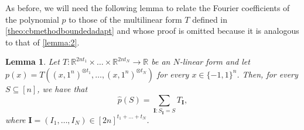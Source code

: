 \documentclass[11pt]{article}
\newcommand{\R}{\mathbb{R}} %
\newcommand{\1}{\mathbf{1}}
\newcommand{\ind}[1]{\mathbf{#1}}
\theoremstyle{plain}
\newtheorem{lemma}[theorem]{Lemma}
\theoremstyle{definition}
\theoremstyle{remark}
\begin{document}
As before, we will need the following lemma to relate the Fourier coefficients of the polynomial $p$ to those of the multilinear form $T$ defined in \cref{theo:cbmethodboundedadapt} and whose proof is omitted because it is analogous to that of \cref{lemma:2}.

\begin{lemma}\label{lemma:2adaptive}
Let  $T:\mathbb R^{2nt_1}\times\dots\times \mathbb R^{2nt_N}\to \R$ be an $N$-linear form and let $p(x)=T((x,1^n)^{\otimes t_1},\dots,(x,1^n)^{\otimes t_N})$ for every $x\in\{-1,1\}^n$. Then, for every $S\subseteq [n]$, we have that 
    \begin{equation*}
        \widehat p(S)= \sum_{\ind I:S_{\ind I}=S}T_{\ind I},
    \end{equation*}
    where ${\ind I}=(I_1, \dots, I_{N})\in [2n]^{t_1+\dots+t_{N}} $. 
    \end{lemma}
   
\end{document}
